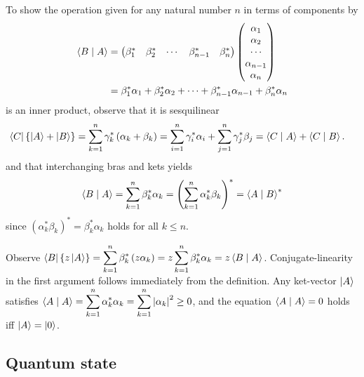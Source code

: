 \begin{answer}
	To show the operation given for any natural number $n$ in terms of components by
	\begin{align*}
		\braket{B \mid A} & =
		\begin{pmatrix}
			\beta_1^* & \beta_2^* & \cdots & \beta_{n-1}^* & \beta_n^*
		\end{pmatrix}
		\begin{pmatrix}
			\alpha_1     \\
			\alpha_2     \\
			\cdots       \\
			\alpha_{n-1} \\
			\alpha_n
		\end{pmatrix}                                                                                                          \\
		                  & = \beta_1^* \alpha_1 + \beta_2^* \alpha_2 + \cdots + \beta_{n-1}^* \alpha_{n-1} + \beta_n^* \alpha_n
	\end{align*}
	is an inner product, observe that it is sesquilinear
	\begin{align*}
		\bra{C} \{ \ket{A} + \ket{B} \} & = \sum_{k=1}^n \gamma_k^* \left(\alpha_k+\beta_k\right) = \sum_{i=1}^n \gamma_i^* \alpha_i + \sum_{j=1}^n \gamma_j^* \beta_j =
		\braket{C \mid A} + \braket{C \mid B}.
	\end{align*}
	and that interchanging bras and kets yields
	\begin{align}
		\braket{B \mid A} = \sum_{k=1}^n \beta_k^* \alpha_k = \left(\sum_{k=1}^n \alpha_k^* \beta_k\right)^* = \braket{A \mid B}^*
	\end{align}
	since $\left(\alpha_k^* \beta_k\right)^* = \beta_k^* \alpha_k$ holds for all $k \leq n$.

	Observe $\displaystyle \bra{B} \{ z \ket{A} \} = \sum_{k=1}^n \beta_k^* \left(z \alpha_k\right) = z \sum_{k=1}^n \beta_k^* \alpha_k = z \braket{B \mid A}$.
	Conjugate-linearity in the first argument follows immediately from the definition.
	Any ket-vector $\ket{A}$ satisfies $\displaystyle \braket{A \mid A} = \sum_{k=1}^n \alpha_k^* \alpha_k = \sum_{k=1}^n \left|\alpha_k\right|^2 \geq 0$, and the equation $\braket{A \mid A} = 0$ holds iff $\ket{A} = \ket{0}$.
\end{answer}

\subsection{Quantum state}

